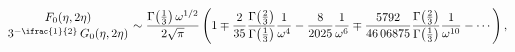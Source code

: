 \[{\mathop{F_{0}\/}\nolimits\!\left(\eta,2\eta\right)\atop{3^{-\ifrac{1}{2}}%
\mathop{G_{0}\/}\nolimits\!\left(\eta,2\eta\right)}}\sim\frac{\mathop{\Gamma\/%
}\nolimits\!\left(\frac{1}{3}\right)\omega^{1/2}}{2\sqrt{\pi}}\left(1\mp\frac{%
2}{35}\frac{\mathop{\Gamma\/}\nolimits\!\left(\frac{2}{3}\right)}{\mathop{%
\Gamma\/}\nolimits\!\left(\frac{1}{3}\right)}\frac{1}{\omega^{4}}-\frac{8}{202%
5}\frac{1}{\omega^{6}}\mp\frac{5792}{46\,06875}\frac{\mathop{\Gamma\/}%
\nolimits\!\left(\frac{2}{3}\right)}{\mathop{\Gamma\/}\nolimits\!\left(\frac{1%
}{3}\right)}\frac{1}{\omega^{10}}-\cdots\right),\]